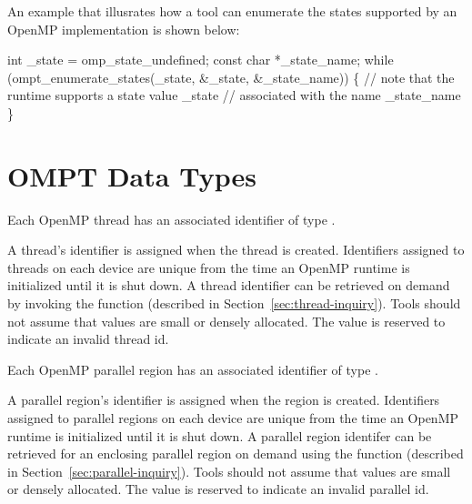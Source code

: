 An example that illusrates how a tool can enumerate the states 
supported by an OpenMP implementation is shown below:

\ccppspecificstart
\begin{boxedcode}
int _state = omp_state_undefined;
const char *_state_name;
while (ompt_enumerate_states(_state, &_state, &_state_name)) \{
  // note that the runtime supports a state value _state 
  // associated with the name _state_name 
\}
\end{boxedcode}
\ccppspecificend

\section{OMPT Data Types}
\label{sec:data}


Each OpenMP thread  has an associated identifier of type .
\begin{comment}
\begin{boxedcode}
typedef uint64\_t ompt\_thread\_id\_t;
\end{boxedcode}
\end{comment}
  A thread's identifier is assigned when the thread is created.
  Identifiers assigned to threads on each device are unique from the time an OpenMP runtime is initialized until it is shut down.
  A thread identifier can be retrieved
  on demand by invoking the  
  function (described in Section~\ref{sec:thread-inquiry}).
  Tools should not assume that  values are small or densely allocated.
  The value  is reserved to indicate an invalid thread id.

Each OpenMP parallel region has an associated identifier of type
.
\begin{comment}
\begin{boxedcode}
typedef uint64\_t ompt\_parallel\_id\_t;
\end{boxedcode}
\end{comment}
  A parallel region's identifier is assigned
  when the region is created.  Identifiers assigned to parallel regions on each device are unique from the time an
  OpenMP runtime is initialized until it is shut down.
  A parallel region identifer can be retrieved for an enclosing parallel region
  on demand using the function   (described in Section~\ref{sec:parallel-inquiry}).
  Tools should not assume that  values are small or densely allocated.
  The value  is reserved to indicate an invalid parallel id.



